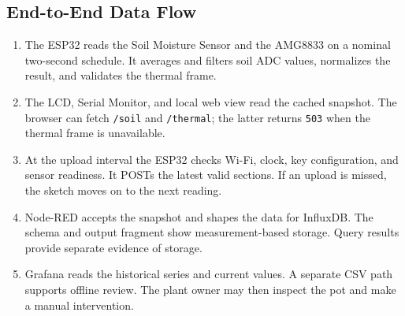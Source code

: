 \documentclass{ieeeaccess}
\newcommand{\code}[1]{\texttt{#1}}
\begin{document}
\subsection{End-to-End Data Flow}
\begin{enumerate}
\item The ESP32 reads the Soil Moisture Sensor and the AMG8833 on a nominal two-second schedule. It averages and filters soil ADC values, normalizes the result, and validates the thermal frame.
\item The LCD, Serial Monitor, and local web view read the cached snapshot. The browser can fetch \code{/soil} and \code{/thermal}; the latter returns \code{503} when the thermal frame is unavailable.
\item At the upload interval the ESP32 checks Wi-Fi, clock, key configuration, and sensor readiness. It POSTs the latest valid sections. If an upload is missed, the sketch moves on to the next reading.
\item Node-RED accepts the snapshot and shapes the data for InfluxDB. The schema and output fragment show measurement-based storage. Query results provide separate evidence of storage.
\item Grafana reads the historical series and current values. A separate CSV path supports offline review. The plant owner may then inspect the pot and make a manual intervention.
\end{enumerate}


\EOD
\end{document}
